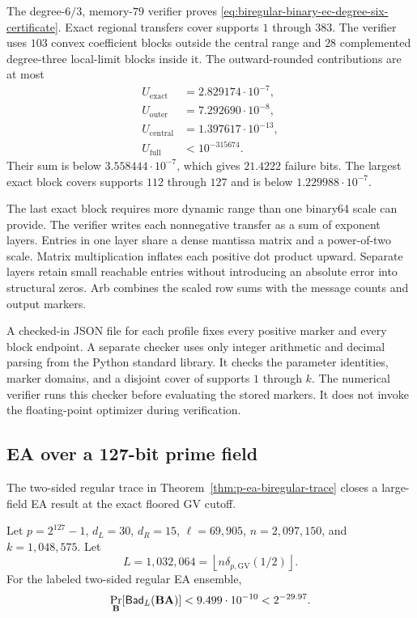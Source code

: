 The degree-$6/3$, memory-$79$ verifier proves
\eqref{eq:biregular-binary-ec-degree-six-certificate}.  Exact regional
transfers cover supports $1$ through $383$.  The verifier uses $103$ convex
coefficient blocks outside the central range and $28$ complemented
degree-three local-limit blocks inside it.  The outward-rounded contributions
are at most
\begin{align*}
 U_{\mathrm{exact}}&=2.829174\cdot10^{-7},\\
 U_{\mathrm{outer}}&=7.292690\cdot10^{-8},\\
 U_{\mathrm{central}}&=1.397617\cdot10^{-13},\\
 U_{\mathrm{full}}&<10^{-315674}.
\end{align*}
Their sum is below $3.558444\cdot10^{-7}$, which gives $21.4222$ failure
bits.  The largest exact block covers supports $112$ through $127$ and is
below $1.229988\cdot10^{-7}$.

The last exact block requires more dynamic range than one binary64 scale can
provide.  The verifier writes each nonnegative transfer as a sum of exponent
layers.  Entries in one layer share a dense mantissa matrix and a power-of-two
scale.  Matrix multiplication inflates each positive dot product upward.
Separate layers retain small reachable entries without introducing an
absolute error into structural zeros.  Arb combines the scaled row sums with
the message counts and output markers.

A checked-in JSON file for each profile fixes every positive marker and every
block endpoint.
A separate checker uses only integer arithmetic and decimal parsing from the
Python standard library.  It checks the parameter identities, marker domains,
and a disjoint cover of supports $1$ through $k$.  The numerical verifier runs
this checker before evaluating the stored markers.  It does not invoke the
floating-point optimizer during verification.

\subsection{EA over a 127-bit prime field}

The two-sided regular trace in Theorem~\ref{thm:p-ea-biregular-trace} closes a
large-field EA result at the exact floored GV cutoff.

\begin{theorem}
\label{thm:p-ea-certificate}
Let $p=2^{127}-1$, $d_L=30$, $d_R=15$, $\ell=69{,}905$,
$n=2{,}097{,}150$, and $k=1{,}048{,}575$.  Let
\begin{equation}
 L=1{,}032{,}064
 =\left\lfloor n\delta_{p,\mathrm{GV}}(1/2)\right\rfloor.
\end{equation}
For the labeled two-sided regular EA ensemble,
\begin{equation}
 \Pr_{\mathbf B}[\mathsf{Bad}_L(\mathbf B\mathbf A)]
 <9.499\cdot10^{-10}<2^{-29.97}.
 \label{eq:p-ea-certificate}
\end{equation}
\end{theorem}

